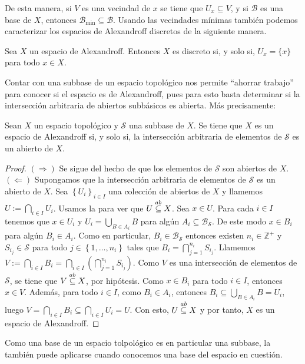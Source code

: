 De esta manera, si $V$ es una vecindad de $x$ se tiene que $U_x\subseteq V$, y si $\mathcal{B}$ es una base de $X$, entonces $\mathcal{B}_{\min}\subseteq \mathcal{B}$. Usando las vecindades mínimas también podemos caracterizar los espacios de Alexandroff discretos de la siguiente manera.
\begin{Prop}\label{Prop:Alexandroff_discreto}
   Sea $X$ un espacio de Alexandroff. Entonces $X$ es discreto si, y solo si, $U_x=\{x\}$ para todo $x\in X$. 
\end{Prop}
Contar con una subbase de un espacio topológico nos permite ``ahorrar trabajo'' para conocer si el espacio es de Alexandroff, pues para esto basta determinar si la intersección arbitraria de abiertos subbásicos es abierta. Más precisamente:
\begin{Prop}\label{Prop:Alexandroff_con_subbase}
   Sean $X$ un espacio topológico y $\mathcal{S}$ una subbase de $X$. Se tiene que $X$ es un espacio de Alexandroff si, y solo si, la intersección arbitraria de elementos de $\mathcal{S}$ es un abierto de $X$.
\end{Prop}
\begin{proof}
   $(\Rightarrow)$ Se sigue del hecho de que los elementos de $\mathcal{S}$ son abiertos de $X$.\\
   $(\Leftarrow)$ Supongamos que la intersección arbitraria de elementos de $\mathcal{S}$ es un abierto de $X$. Sea $\left\{ U_i\right\}_{i\in I}$ una colección de abiertos de $X$ y llamemos $U:=\bigcap_{i\in I}U_i$. Usamos la  para ver que $U \stackrel{ab}{\subseteq} X$. Sea $x\in U$. Para cada $i\in I$ tenemos que $x\in U_i$ y $U_i=\bigcup_{B\in A_i}B$ para algún $A_i\subseteq \mathcal{B}_{\mathcal{S}}$. De este modo $x\in B_i$ para algún $B_i\in A_i$. Como en particular, $B_i\in \mathcal{B}_\mathcal{S}$ entonces existen $n_i\in \mathbb{Z}^+$ y $S_{i_j}\in \mathcal{S}$ para todo $j\in\left\lbrace 1,\dots ,n_i\right\rbrace$ tales que $B_i=\bigcap_{j=1}^{n_i}S_{i_j}$. Llamemos $V:=\bigcap_{i\in I}B_i=\bigcap_{i\in I}\left( \bigcap_{j=1}^{n_i}S_{i_j}\right)$. Como $V$ es una intersección de elementos de $\mathcal{S}$, se tiene que $V\stackrel{ab}{\subseteq} X$, por hipótesis. Como $x\in B_i$ para todo $i\in I$, entonces $x\in V$. Además, para todo $i\in I$, como $B_i\in A_i$, entonces $B_i\subseteq \bigcup_{B\in A_i}B=U_i$, luego $V=\bigcap_{i\in I}B_i\subseteq \bigcap_{i\in I}U_i=U$. Con esto, $U\stackrel{ab}{\subseteq} X$ y por tanto, $X$ es un espacio de Alexandroff.
\end{proof}
Como una base de un espacio tolpológico es en particular una subbase, la  también puede aplicarse cuando conocemos una base del espacio en cuestión.\\\\
